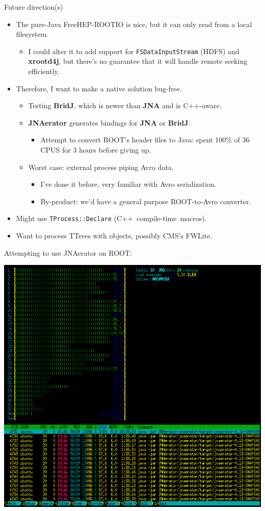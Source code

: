 \documentclass{beamer}
\begin{document}
\begin{frame}{Future direction(s)}
\begin{itemize}
\item The pure-Java FreeHEP-ROOTIO is nice, but it can only read from a local filesystem.
\begin{itemize}
\item I could alter it to add support for {\tt FSDataInputStream} (HDFS) and {\bf xrootd4j}, but there's no guarantee that it will handle remote seeking efficiently.
\end{itemize}

\item Therefore, I want to make a native solution bug-free.
\begin{itemize}
\item Testing {\bf BridJ}, which is newer than {\bf JNA} and is C++-aware.
\item {\bf JNAerator} generates bindings for {\bf JNA} or {\bf BridJ}.
\begin{itemize}
\item Attempt to convert ROOT's header files to Java: spent 100\% of 36 CPUS for 3 hours before giving up.
\end{itemize}
\item Worst case: external process piping Avro data.
\begin{itemize}
\item I've done it before, very familiar with Avro serialization.
\item By-product: we'd have a general purpose ROOT-to-Avro converter.
\end{itemize}
\end{itemize}

\item Might use {\tt TProcess::Declare} \mbox{(C++ compile-time macros).\hspace{-1 cm}}

\item Want to process TTrees with objects, possibly CMS's FWLite.
\end{itemize}
\end{frame}

\begin{frame}{Attempting to use JNAerator on ROOT:}
\begin{center}
\includegraphics[width=0.9\linewidth]{parallel_parsing.png}
\end{center}
\end{frame}
\end{document}
